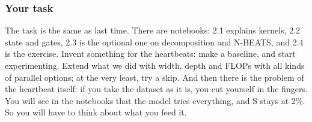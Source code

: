\documentclass[12pt, a4paper]{article}
\theoremstyle{definition}
\theoremstyle{remark}
\begin{document}
\subsubsection{Your task}
The task is the same as last time. There are notebooks: 2.1 explains kernels, 2.2 state and gates, 2.3 is the optional one on decomposition and N-BEATS, and 2.4 is the exercise. Invent something for the heartbeats: make a baseline, and start experimenting. Extend what we did with width, depth and FLOPs with all kinds of parallel options; at the very least, try a skip. And then there is the problem of the heartbeat itself: if you take the dataset as it is, you cut yourself in the fingers. You will see in the notebooks that the model tries everything, and S stays at 2\%. So you will have to think about what you feed it.
\end{document}
